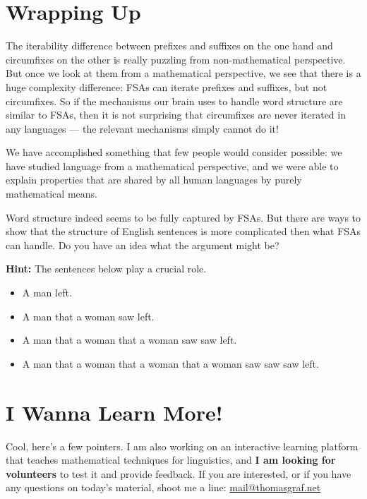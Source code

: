 \section{Wrapping Up}

The iterability difference between prefixes and suffixes on the one hand and circumfixes on the other is really puzzling from non-mathematical perspective.
But once we look at them from a mathematical perspective, we see that there is a huge complexity difference: FSAs can iterate prefixes and suffixes, but not circumfixes.
So if the mechanisms our brain uses to handle word structure are similar to FSAs, then it is not surprising that circumfixes are never iterated in any languages --- the relevant mechanisms simply cannot do it!

We have accomplished something that few people would consider possible: we have studied language from a mathematical perspective, and we were able to explain properties that are shared by all human languages by purely mathematical means.

\bigskip
{}

\bigskip
\begin{homework}
    Word structure indeed seems to be fully captured by FSAs.
    But there are ways to show that the structure of English sentences is more complicated then what FSAs can handle.
    Do you have an idea what the argument might be?
    
    \smallskip
    \textbf{Hint:} The sentences below play a crucial role.
        \begin{itemize}
            \item A man left.
            \item A man that a woman saw left.
            \item A man that a woman that a woman saw saw left.
            \item A man that a woman that a woman that a woman saw saw saw left.
        \end{itemize}
\end{homework}

\section{I Wanna Learn More!}

Cool, here's a few pointers.
I am also working on an interactive learning platform that teaches mathematical techniques for linguistics, and \textbf{\textcolor{Red3}{I am looking for volunteers}} to test it and provide feedback.
If you are interested, or if you have any questions on today's material, shoot me a line: \href{mailto:mail@thomasgraf.net}{mail@thomasgraf.net}


